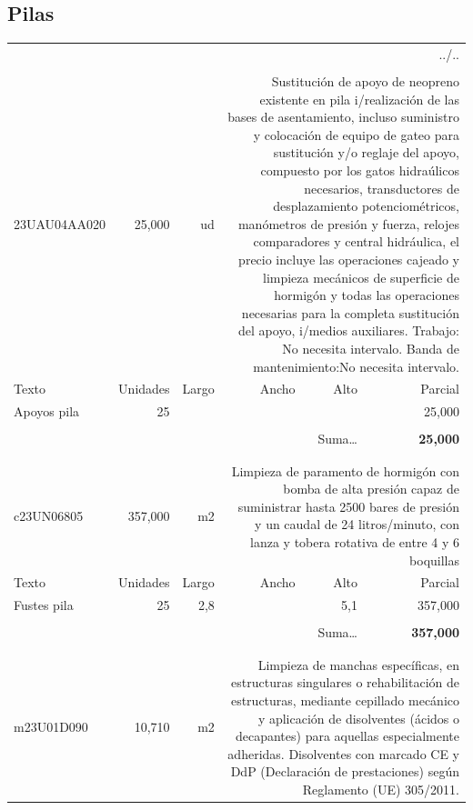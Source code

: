 \documentclass{book}%
\begin{document}
%
\subsection{Pilas}%
\begin{longtable}{lrrrrr}%
\multicolumn{6}{r}{../..}\\%
\endfoot%
\endlastfoot%
&&&&&\\%
23UAU04AA020&    25,000& ud&\multicolumn{3}{p{6cm}}{\scriptsize Sustitución de apoyo de neopreno existente en pila i/realización de las bases de asentamiento, incluso suministro y colocación de equipo de gateo para sustitución y/o reglaje del apoyo, compuesto por los gatos hidraúlicos necesarios, transductores de desplazamiento potenciométricos, manómetros de presión y fuerza, relojes comparadores y central hidráulica, el precio incluye las operaciones cajeado y limpieza mecánicos de superficie de hormigón y todas las operaciones necesarias para la completa sustitución del apoyo, i/medios auxiliares. Trabajo: No necesita intervalo. Banda de mantenimiento:No necesita intervalo.\normalsize}\\%
Texto&Unidades&Largo&Ancho&Alto&Parcial\\%
\hline%
\multicolumn{1}{p{3.5cm}}{Apoyos pila}&25&&&&    25,000\\%
&&&&&\\%
\multicolumn{5}{r}{Suma\ldots}&\textbf{    25,000}\\%
\hline%
&&&&&\\%
&&&&&\\%
c23UN06805&   357,000& m2&\multicolumn{3}{p{6cm}}{\scriptsize Limpieza de paramento de hormigón con bomba de alta presión capaz de suministrar hasta 2500 bares de presión y un caudal de 24 litros/minuto, con lanza y tobera rotativa de entre 4 y 6 boquillas\normalsize}\\%
Texto&Unidades&Largo&Ancho&Alto&Parcial\\%
\hline%
\multicolumn{1}{p{3.5cm}}{Fustes pila}&25&2,8&&5,1&   357,000\\%
&&&&&\\%
\multicolumn{5}{r}{Suma\ldots}&\textbf{   357,000}\\%
\hline%
&&&&&\\%
&&&&&\\%
m23U01D090&    10,710& m2&\multicolumn{3}{p{6cm}}{\scriptsize Limpieza de manchas específicas, en estructuras singulares o rehabilitación de estructuras, mediante cepillado mecánico y aplicación de disolventes (ácidos o decapantes) para aquellas especialmente adheridas. Disolventes con marcado CE y DdP (Declaración de prestaciones) según Reglamento (UE) 305/2011.\normalsize}\\%

\end{longtable}
\end{document}
